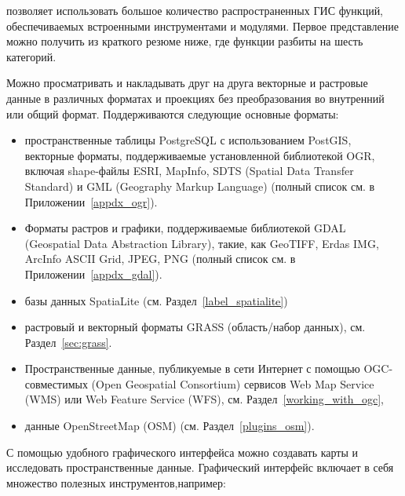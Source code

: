 \label{label_majfeat}

\qg позволяет использовать большое количество распространенных ГИС функций,
обеспечиваемых встроенными инструментами и модулями. Первое представление
можно получить из краткого резюме ниже, где функции разбиты на шесть
категорий.


Можно просматривать и накладывать друг на друга векторные и растровые
данные в различных форматах и проекциях без преобразования во внутренний
или общий формат. Поддерживаются следующие основные форматы:

\begin{itemize}[label=--]
\item пространственные таблицы PostgreSQL с использованием PostGIS, векторные
форматы,
поддерживаемые установленной библиотекой OGR, включая shape-файлы ESRI,
MapInfo, SDTS (Spatial Data Transfer Standard) и GML (Geography Markup
Language) (полный список см. в Приложении~\ref{appdx_ogr}).
\item Форматы растров и графики, поддерживаемые
библиотекой GDAL (Geospatial Data Abstraction Library), такие, как
GeoTIFF, Erdas IMG, ArcInfo ASCII Grid, JPEG, PNG (полный список см. в
Приложении~\ref{appdx_gdal}).
\item базы данных SpatiaLite (см. Раздел~\ref{label_spatialite})
\item растровый и векторный форматы GRASS (область/набор данных),
см. Раздел~\ref{sec:grass}.
\item Пространственные данные, публикуемые в сети Интернет с помощью
OGC-совместимых (Open Geospatial Consortium) сервисов Web Map Service
(WMS) или Web Feature Service (WFS), см. Раздел~\ref{working_with_ogc},
\item данные OpenStreetMap (OSM) (см. Раздел~\ref{plugins_osm}).
\end{itemize}


С помощью удобного графического интерфейса можно создавать карты и
исследовать пространственные данные. Графический интерфейс включает в
себя множество полезных инструментов,например:

